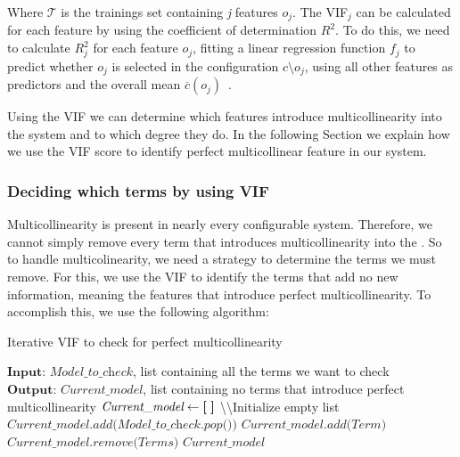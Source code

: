 Where $\mathcal{T}$ is the trainings set containing \textit{j} features $o_j$. The VIF$_{j}$ can be calculated for each feature by using the coefficient
of determination $R^2$. To do this, we need to calculate $R^{2}_j$ for each feature $o_j$, fitting a linear regression function $f_j$ to predict whether $o_j$
is selected in the configuration $c \setminus o_j$, using all other features as predictors and the overall mean $\overline{c}(o_j)$~\cite{Multicollinearity}.

Using the VIF we can determine which features introduce multicollinearity into the system and to which degree they do. In the following Section we 
explain how we use the VIF score to identify perfect multicollinear feature in our system.

\subsubsection{Deciding which terms by using VIF}\label{ch:iterative-vif}
Multicollinearity is present in nearly every configurable system. 
Therefore, we cannot simply remove every term that introduces multicollinearity into the {\perfInfluenceModel}. 
So to handle multicolinearity, we need a strategy to determine the terms we must remove. 
For this, we use the VIF to identify the terms that add no new information, 
meaning the features that introduce perfect multicollinearity. To accomplish this, we use the following algorithm:

\begin{algorithm}
    \caption{Iterative VIF to check for perfect multicollinearity}\label{alg:vif_iterative}
    \begin{algorithmic}[1]
    \State $\textbf{Input: } \textit{Model\_to\_check}$, list containing all the terms we want to check 
    \State $\textbf{Output: } \textit{Current\_model}$, list containing no terms that introduce perfect multicollinearity
    \State $\textit{Current\_model} \gets \textbf{[\;]}$ \textbackslash\textbackslash Initialize empty list
    \State $\textit{Current\_model.add(Model\_to\_check.pop())} $ \label{alg:vif_add_item}
        \State $\textit{Current\_model.add(Term)}$
        \label{alg:vif_check} \\    
            \qquad$\textit{Current\_model.remove(Terms)}$ 
        \EndIf
    \EndFor
    \State\Return $\textit{Current\_model}$

    \end{algorithmic}
\end{algorithm}

